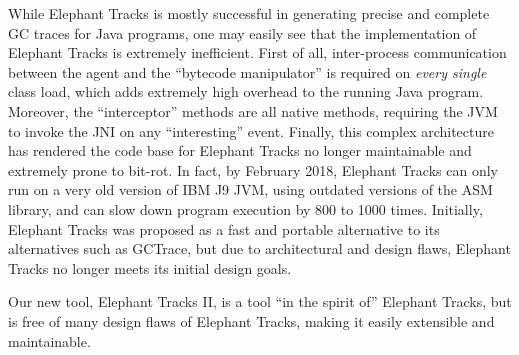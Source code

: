 While Elephant Tracks is mostly successful in generating precise and complete GC traces for Java programs, one may easily see that
the implementation of Elephant Tracks is extremely inefficient. First of all, inter-process communication between the agent and the
``bytecode manipulator'' is required on \emph{every single} class load, which adds extremely high overhead to the running Java program.
Moreover, the ``interceptor'' methods are all native methods, requiring the JVM to invoke the JNI on any ``interesting'' event. Finally,
this complex architecture has rendered the code base for Elephant Tracks no longer maintainable and extremely prone to bit-rot. In fact,
by February 2018, Elephant Tracks can only run on a very old version of IBM J9 JVM, using outdated versions of the ASM library, and can
slow down program execution by 800 to 1000 times. Initially, Elephant Tracks was proposed as a fast and portable alternative to its alternatives
such as GCTrace, but due to architectural and design flaws, Elephant Tracks no longer meets its initial design goals.

Our new tool, Elephant Tracks II, is a tool ``in the spirit of'' Elephant Tracks, but is free of many design flaws of Elephant Tracks, making
it easily extensible and maintainable.
